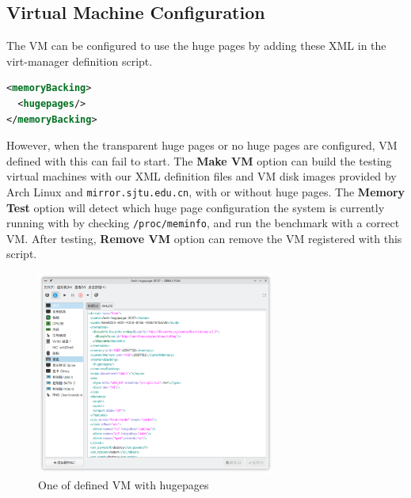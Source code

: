 \documentclass[12pt]{article}
\begin{document}
\subsection{Virtual Machine Configuration}

The VM can be configured to use the huge pages by adding these XML in the virt-manager definition script.

\begin{lstlisting}[language=xml]
<memoryBacking>
  <hugepages/>
</memoryBacking>
\end{lstlisting}

However, when the transparent huge pages or no huge pages are configured, VM defined with this can fail to start. The \textbf{Make VM} option can build the testing virtual machines with our XML definition files and VM disk images provided by Arch Linux and \texttt{mirror.sjtu.edu.cn}, with or without huge pages. The \textbf{Memory Test} option will detect which huge page configuration the system is currently running with by checking \texttt{/proc/meminfo}, and run the benchmark with a correct VM. After testing, \textbf{Remove VM} option can remove the VM registered with this script.

\begin{figure}[h]
	\centering
	\includegraphics[width=0.7\textwidth]{fig2.png}
	\caption{One of defined VM with hugepages}
	\label{fig:df}
\end{figure}




\end{document}
